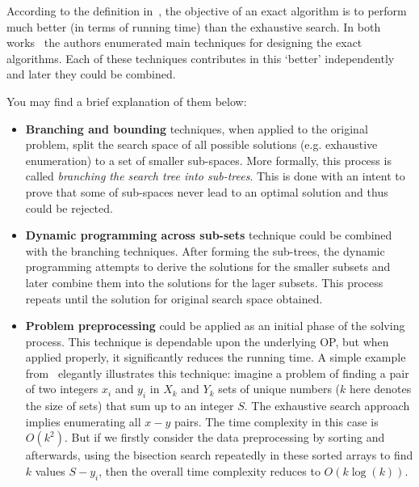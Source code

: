 According to the definition in~\cite{fomin2013exact}, the objective of an exact algorithm is to perform much better (in terms of running time) than the exhaustive search. In both works~\cite{woeginger2003exact,fomin2013exact} the authors enumerated main techniques for designing the exact algorithms. Each of these techniques contributes in this `better' independently and later they could be combined.

You may find a brief explanation of them below:
\begin{itemize}
	\item \textbf{Branching and bounding} techniques, when applied to the original problem, split the search space of all possible solutions (e.g. exhaustive enumeration) to a set of smaller sub-spaces. More formally, this process is called \emph{branching the search tree into sub-trees}. This is done with an intent to prove that some of sub-spaces never lead to an optimal solution and thus could be rejected.
	
	\item \textbf{Dynamic programming across sub-sets} technique could be combined with the  branching techniques. After forming the sub-trees, the dynamic programming attempts to derive the solutions for the smaller subsets and later combine them into the solutions for the lager subsets. This process repeats until the solution for original search space obtained.
	
	\item \textbf{Problem preprocessing} could be applied as an initial phase of the solving process. This technique is dependable upon the underlying OP, but when applied properly, it significantly reduces the running time. A simple example from~\cite{woeginger2003exact} elegantly illustrates this technique: imagine a problem of finding a pair of two integers $x_i$ and $y_i$ in $X_k$ and $Y_k$ sets of unique numbers ($k$ here denotes the size of sets) that sum up to an integer $S$. The exhaustive search approach implies enumerating all $x-y$ pairs. The time complexity in this case is $O(k^2)$. But if we firstly consider the data preprocessing by sorting and afterwards, using the bisection search repeatedly in these sorted arrays to find $k$ values $S - y_i$, then the overall time complexity reduces to $O(k\log(k))$.
\end{itemize}

